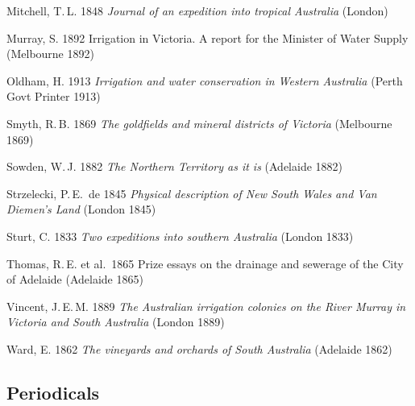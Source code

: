 Mitchell, T.\,L. 1848 \textsl{Journal of an expedition into tropical
Australia} (London)

Murray, S. 1892 Irrigation in Victoria.  A report for the Minister of
Water Supply (Melbourne 1892)

Oldham, H. 1913 \textsl{Irrigation and water conservation in Western
Australia} (Perth Govt Printer 1913)

Smyth, R.\,B. 1869 \textsl{The goldfields and mineral districts of
Victoria} (Melbourne 1869)

Sowden, W.\,J. 1882 \textsl{The Northern Territory as it is} (Adelaide
1882)

Strzelecki, P.\,E.~de 1845 \textsl{Physical description of New South
Wales and Van Diemen's Land} (London 1845)

Sturt, C. 1833 \textsl{Two expeditions into southern Australia}
(London 1833)

Thomas, R.\,E. et al.\ 1865 Prize essays on the drainage and sewerage of
the City of Adelaide (Adelaide 1865)

Vincent, J.\,E.\,M. 1889 \textsl{The Australian irrigation colonies on
the River Murray in Victoria and South Australia} (London 1889)

Ward, E. 1862 \textsl{The vineyards and orchards of South Australia}
(Adelaide 1862)

\subsection*{Periodicals}

